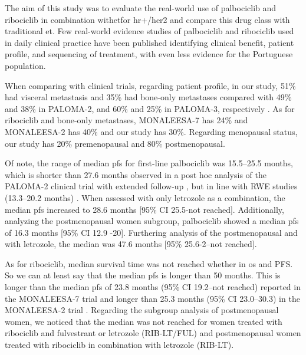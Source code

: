 The aim of this study was to evaluate the real-world use of palbociclib and ribociclib in combination with\ac{et}for \ac{hr+}/\ac{her2} and compare this drug class with traditional \ac{et}. Few real-world evidence studies of palbociclib and ribociclib used in daily clinical practice have been published identifying clinical benefit, patient profile, and sequencing of treatment, with even less evidence for the Portuguese population.

When comparing with clinical trials, regarding patient profile, in our study, 51\% had visceral metastasis and 35\% had bone-only metastases compared with 49\% and 38\% in PALOMA-2, and 60\% and 25\% in PALOMA-3, respectively \cite{rugoImpactPalbociclibLetrozole2018,cristofanilliFulvestrantPalbociclibFulvestrant2016a}.
As for ribociclib and bone-only metastases, MONALEESA-7 \cite{tripathyRibociclibEndocrineTherapy2018} has 24\% and MONALEESA-2 has 40\% \cite{hortobagyiUpdatedResultsMONALEESA22018} and our study has 30\%. Regarding menopausal status, our study has 20\% premenopausal and 80\% postmenopausal. 



Of note, the range of median \ac{pfs} for first-line palbociclib was 15.5–25.5 months, which is shorter than 27.6 months observed in a post hoc analysis of the PALOMA-2 clinical trial with extended follow-up \cite{rugoImpactPalbociclibLetrozole2018}, but in line with RWE studies (13.3–20.2 months) \cite{harbeckCDK4InhibitorsHR2021}. When assessed with only letrozole as a combination, the median \ac{pfs} increased to 28.6 months [95\% CI 25.5-not reached]. Additionally, analyzing the postmenopausal women subgroup, palbociclib showed a median \ac{pfs} of 16.3 months [95\% CI 12.9 -20]. Furthering analysis of the postmenopausal and with letrozole, the median was 47.6 months [95\% 25.6-2–not reached].

As for ribociclib, median survival time was not reached whether in \ac{os} and PFS. So we can at least say that the median \ac{pfs} is longer than 50 months. This is longer than the median \ac{pfs} of 23.8 months (95\% CI 19.2–not reached) reported in the MONALEESA-7 trial \cite{tripathyRibociclibEndocrineTherapy2018} and longer than  25.3 months (95\% CI 23.0–30.3) in the MONALEESA-2 trial \cite{hortobagyiUpdatedResultsMONALEESA22018}. Regarding the subgroup analysis of postmenopausal women, we noticed that the median was not reached for women treated with ribociclib and fulvestrant or letrozole (RIB-LT/FUL) and postmenopausal women treated with ribociclib in combination with letrozole (RIB-LT).

